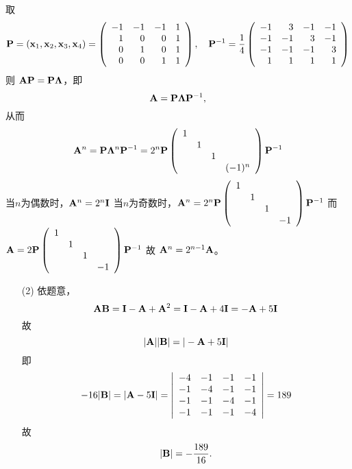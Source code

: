 \begin{frame}
\begin{footnotesize}
  取
  $$
  \mathbf{P}=(\mathbf{x}_1,\mathbf{x}_2,\mathbf{x}_3,\mathbf{x}_4)=\left(
  \begin{array}{rrrr}
    -1 & -1& -1&  1 \\
    1  &  0&  0&  1 \\
    0  &  1&  0&  1  \\
    0  &  0&  1&  1 
  \end{array}
  \right), ~~~\mathbf{P}^{-1}=\frac14 \left(
  \begin{array}{rrrr}
    -1 &   3& -1&  -1 \\
    -1 &  -1&  3&  -1 \\
    -1 &  -1& -1&   3  \\
     1 &   1&  1&   1 
  \end{array}
  \right)
  $$
  则 $\mathbf{A}\mathbf{P}=\mathbf{P}\mathbf{\Lambda}$，即
  $$
  \mathbf{A}=\mathbf{P}\mathbf{\Lambda}\mathbf{P}^{-1},
  $$
  从而$$
  \mathbf{A}^{n}=\mathbf{P}\mathbf{\Lambda}^n\mathbf{P}^{-1}
  =2^n \mathbf{P}\left(
  \begin{array}{cccc}
    1&&&\\
    &1&&\\
    &&1&\\
    &&&(-1)^n
  \end{array}
  \right)\mathbf{P}^{-1}
  $$
  当$n$为偶数时，$\mathbf{A}^n=2^n \mathbf{I}$
  当$n$为奇数时，$\mathbf{A}^n=2^n\mathbf{P}\left(
  \begin{array}{cccc}
    1&&&\\
    &1&&\\
    &&1&\\
    &&&-1
  \end{array}
  \right)\mathbf{P}^{-1} $
  而
  $
  \mathbf{A}=2\mathbf{P}\left(
  \begin{array}{cccc}
    1&&&\\
    &1&&\\
    &&1&\\
    &&&-1
  \end{array}
  \right)\mathbf{P}^{-1} 
  $
  故
  $
  \mathbf{A}^n=2^{n-1}\mathbf{A}
  $。
\end{footnotesize}
\end{frame}

\begin{frame}
\begin{footnotesize}
  \begin{itemize}
  \item[(2)]
    依题意，
    $$
    \mathbf{A}\mathbf{B}=\mathbf{I}-\mathbf{A}+\mathbf{A}^2=\mathbf{I}-\mathbf{A}+4\mathbf{I}=-\mathbf{A}+5\mathbf{I}
    $$
    故
    $$
    |\mathbf{A}||\mathbf{B}|=|-\mathbf{A}+5\mathbf{I}|
    $$
    即
    $$
    -16 |\mathbf{B}| = |\mathbf{A}-5\mathbf{I}| =\left|
    \begin{array}{rrrr}
      -4&-1&-1&-1\\
      -1&-4&-1&-1\\
      -1&-1&-4&-1\\
      -1&-1&-1&-4
    \end{array}
    \right| = 189
    $$
    故
    $$
    |\mathbf{B}|=-\frac{189}{16}.
    $$
  \end{itemize}
\end{footnotesize}
\end{frame}

